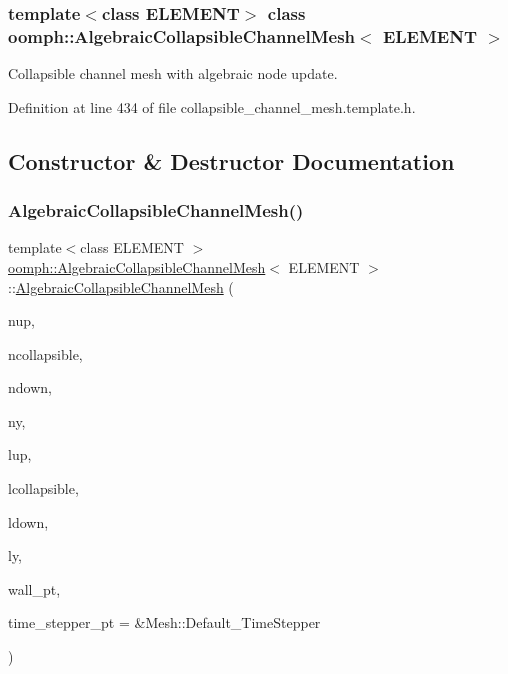 \subsubsection*{template$<$class E\+L\+E\+M\+E\+NT$>$\newline
class oomph\+::\+Algebraic\+Collapsible\+Channel\+Mesh$<$ E\+L\+E\+M\+E\+N\+T $>$}

Collapsible channel mesh with algebraic node update. 

Definition at line 434 of file collapsible\+\_\+channel\+\_\+mesh.\+template.\+h.



\subsection{Constructor \& Destructor Documentation}
\mbox{\label{classoomph_1_1AlgebraicCollapsibleChannelMesh_ac2e77539dfed482cc3d8b7c9e17a9567}} 
\subsubsection{\texorpdfstring{Algebraic\+Collapsible\+Channel\+Mesh()}{AlgebraicCollapsibleChannelMesh()}\hspace{0.1cm}{\footnotesize\ttfamily [1/2]}}
{\footnotesize\ttfamily template$<$class E\+L\+E\+M\+E\+NT $>$ \\
\hyperlink{classoomph_1_1AlgebraicCollapsibleChannelMesh}{oomph\+::\+Algebraic\+Collapsible\+Channel\+Mesh}$<$ E\+L\+E\+M\+E\+NT $>$\+::\hyperlink{classoomph_1_1AlgebraicCollapsibleChannelMesh}{Algebraic\+Collapsible\+Channel\+Mesh} (\begin{DoxyParamCaption}\item[{const unsigned \&}]{nup,  }\item[{const unsigned \&}]{ncollapsible,  }\item[{const unsigned \&}]{ndown,  }\item[{const unsigned \&}]{ny,  }\item[{const double \&}]{lup,  }\item[{const double \&}]{lcollapsible,  }\item[{const double \&}]{ldown,  }\item[{const double \&}]{ly,  }\item[{Geom\+Object $\ast$}]{wall\+\_\+pt,  }\item[{Time\+Stepper $\ast$}]{time\+\_\+stepper\+\_\+pt = {\ttfamily \&Mesh\+:\+:Default\+\_\+TimeStepper} }\end{DoxyParamCaption})\hspace{0.3cm}{\ttfamily [inline]}}



